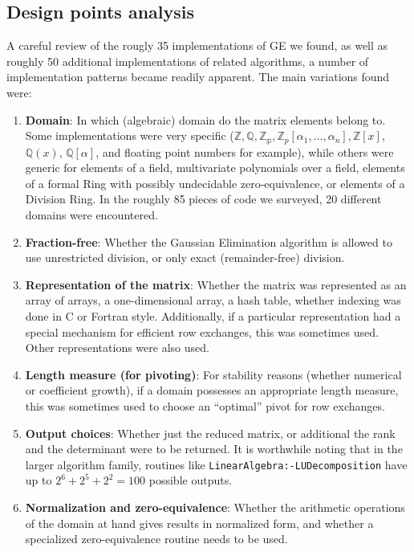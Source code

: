 \documentclass[11pt]{elsart}
\begin{document}
\subsection{Design points analysis}\label{designpoints}

A careful review of the rougly 35 implementations of GE we found, as
well as roughly 50 additional implementations of related algorithms, 
a number of implementation patterns became readily apparent.  The main 
variations found were:
\begin{enumerate}
	\item \textbf{Domain}: In which (algebraic) domain do the matrix
		elements belong to.  Some implementations were very specific
		($\mathbb{Z}, \mathbb{Q}, \mathbb{Z_p}, 
		\mathbb{Z}_p\left[\alpha_1,\ldots,\alpha_n\right], 
		\mathbb{Z}\left[x\right]$, $\mathbb{Q}\left(x\right)$, 
		$\mathbb{Q}\left[\alpha\right]$, and floating point numbers for 
		example), while others were generic for elements of a field,
		multivariate polynomials over a field, elements of a formal Ring
		with possibly undecidable zero-equivalence, or elements of a 
		Division Ring.  In the roughly 85 pieces of code we surveyed,
		20 different domains were encountered.
	\item \textbf{Fraction-free}: Whether the Gaussian Elimination
		algorithm is allowed to use unrestricted division, or only
		exact (remainder-free) division.
	\item \textbf{Representation of the matrix}: Whether the matrix
		was represented as an array of arrays, a one-dimensional array,
		a hash table, 
		whether indexing was done in C or Fortran style.  Additionally,
		if a particular representation had a special mechanism for efficient
		row exchanges, this was sometimes used.  Other representations
		were also used.
	\item \textbf{Length measure (for pivoting)}:  For stability reasons
		(whether numerical or coefficient growth), if a domain possesses
		an appropriate length measure, this was sometimes used to choose
		an ``optimal'' pivot for row exchanges.
	\item \textbf{Output choices}:  Whether just the reduced matrix, or
		additional the rank and the determinant were to be returned.
		It is worthwhile noting that in the larger algorithm family,
		routines like \texttt{LinearAlgebra:-LUDecomposition} have
		up to $2^6 + 2^5 + 2^2 = 100$ possible outputs.
	\item \textbf{Normalization and zero-equivalence}: Whether the 
		arithmetic operations of the domain at hand gives results in 
		normalized form, and whether a specialized zero-equivalence 
		routine needs to be used.
\end{enumerate}
\end{document}
